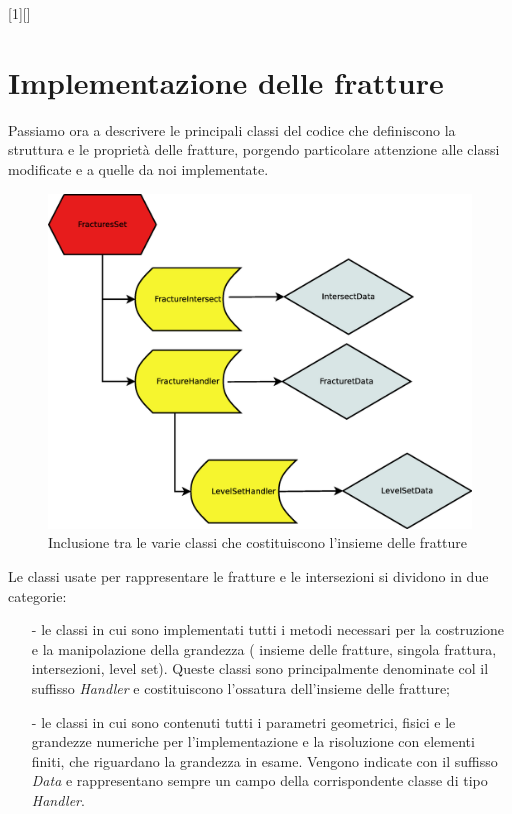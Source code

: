 [1][]{}{}

\chapter{Implementazione delle fratture}
Passiamo ora a descrivere le principali classi del codice che definiscono la struttura e le proprietà delle fratture, porgendo particolare attenzione alle classi modificate e a quelle da noi implementate.\\

\begin{figure}[htbp]
\includegraphics[width=1\textwidth]{img/fratture.eps}
\caption{Inclusione tra le varie classi che costituiscono l'insieme delle fratture}\label{Inclusione classi}
\end{figure}


\par Le classi usate per rappresentare le fratture e le intersezioni si dividono in due categorie:
\begin{enumerate}
\item[-] le classi in cui sono implementati tutti i metodi necessari per la costruzione e la manipolazione della grandezza ( insieme delle fratture, singola frattura, intersezioni, level set). Queste classi sono principalmente denominate col il suffisso \textit{Handler} e costituiscono l'ossatura dell'insieme delle fratture;
\item[-] le classi in cui sono contenuti tutti i parametri geometrici, fisici e le grandezze numeriche per l'implementazione e la risoluzione con elementi finiti, che riguardano la grandezza in esame. Vengono indicate con il suffisso \textit{Data} e rappresentano sempre un campo della corrispondente classe di tipo \textit{Handler}.
\end{enumerate}



